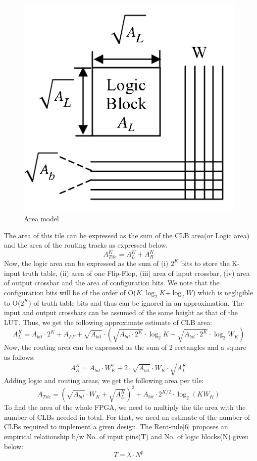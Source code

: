 \begin{figure}[h]
\centering
\includegraphics[width=0.3\linewidth]{area_model.png}
\caption{Area model}
\label{fig:Figure}
\end{figure}
The area of this tile can be expressed as the sum of the CLB area(or Logic area) and the area of the routing tracks as expressed below.
\begin{equation}
A_{Tile}^K = A_L^K + A_R^K
\end{equation}
Now, the logic area can be expressed as the sum of (i) $2^K$ bits to store the K-input truth table, (ii) area of one Flip-Flop, (iii) area of input crossbar, (iv) area of output crossbar and the area of configuration bits. We note that the configuration bits will be of the order of O($K.\log_{2}K$+$\log_{2}W$) which is negligible to O($2^K$) of truth table bits and thus can be ignored in an approximation. The input and output crossbars can be assumed of the same height as that of the LUT. Thus, we get the following approximate estimate of CLB area:
\begin{equation}
A_L^K = A_{bit}\cdot2^K + A_{FF} + \sqrt{A_{bit}}\cdot(\sqrt{A_{bit}\cdot2^K}\cdot\log_{2}{K}+\sqrt{A_{bit}\cdot2^K}\cdot\log_{2}{W_K})
\end{equation}
Now, the routing area can be expressed as the sum of 2 rectangles and a square as follows:
\begin{equation}
A_R^K = A_{bit}\cdot{W_K^2} + 2\cdot\sqrt{A_{bit}}\cdot{W_K}\cdot\sqrt{A_L^K}
\end{equation}
Adding logic and routing areas, we get the following area per tile:
\begin{equation}
A_{Tile} = {(\sqrt{A_{bit}}\cdot{W_K}+\sqrt{A_L^K})}^2 + A_{bit}\cdot2^{K/2}\cdot\log_{2}{(KW_K)}
\end{equation}
To find the area of the whole FPGA, we need to multiply the tile area with the number of CLBs needed in total. For that, we need an estimate of the number of CLBs required to implement a given design. The Rent-rule[6] proposes an empirical relationship b/w No. of input pins(T) and No. of logic blocks(N) given below:
\begin{equation}
T = \lambda\cdot{N^p}
\end{equation}
